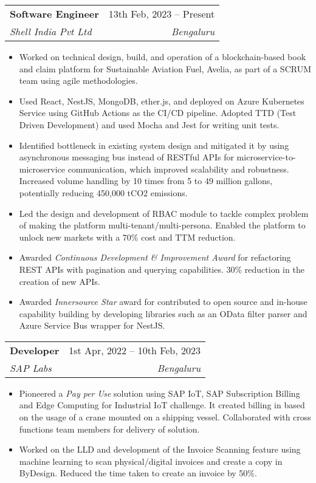 \documentclass[letterpaper,11pt]{article}
\makeatletter
\newcommand{\resumeItem}[1]{
  \item\small{
    {#1 \vspace{-2pt}}
  }
}
\newcommand{\resumeSubheading}[4]{
  \vspace{-2pt}\item
    \begin{tabular*}{0.97\textwidth}[t]{l@{\extracolsep{\fill}}r}
      \textbf{#1} & #2 \\
      \textit{\small#3} & \textit{\small #4} \\
    \end{tabular*}\vspace{-7pt}
}
\newcommand{\resumeSubSubheading}[2]{
    \item
    \begin{tabular*}{0.97\textwidth}{l@{\extracolsep{\fill}}r}
      \textit{\small#1} & \textit{\small #2} \\
    \end{tabular*}\vspace{-7pt}
}
\newcommand{\resumeSubHeadingListEnd}{\end{itemize}}
\newcommand{\resumeItemListStart}{\begin{itemize}}
\newcommand{\resumeItemListEnd}{\end{itemize}\vspace{-5pt}}
\makeatother
\begin{document}
    \resumeSubheading
      {Software Engineer}{13th Feb, 2023 -- Present}
      {Shell India Pvt Ltd}{Bengaluru}
      \resumeItemListStart
        \resumeItem{Worked on technical design, build, and operation of a blockchain-based book and claim platform for Sustainable Aviation Fuel, Avelia, as part of a SCRUM team using agile methodologies.}
        \resumeItem{Used React, NestJS, MongoDB, ether.js, and deployed on Azure Kubernetes Service using GitHub Actions as the CI/CD pipeline. Adopted TTD (Test Driven Development) and used Mocha and Jest for writing unit tests.}
        \resumeItem{Identified bottleneck in existing system design and mitigated it by using asynchronous messaging bus instead of RESTful APIs for microservice-to-microservice communication, which improved scalability and robustness. Increased volume handling by 10 times from 5 to 49 million gallons, potentially reducing 450,000 tCO2 emissions.}
        \resumeItem{Led the design and development of RBAC module to tackle complex problem of making the platform multi-tenant/multi-persona. Enabled the platform to unlock new markets with a 70\% cost and TTM reduction.}
        \resumeItem{Awarded \emph{Continuous Development \& Improvement Award} for refactoring REST APIs with pagination and querying capabilities. 30\% reduction in the creation of new APIs. }
        \resumeItem{Awarded \emph{Innersource Star} award for contributed to open source and in-house capability building by developing libraries such as an OData filter parser and Azure Service Bus wrapper for NestJS.}
      \resumeItemListEnd
      

    \resumeSubheading
      {Developer}{1st Apr, 2022 -- 10th Feb, 2023}
      {SAP Labs}{Bengaluru}
      \resumeItemListStart
        \resumeItem{Pioneered a \emph{Pay per Use} solution using SAP IoT, SAP Subscription Billing and Edge Computing for Industrial IoT challenge. It created billing in based on the usage of a crane mounted on a shipping vessel. Collaborated with cross functions team members for delivery of solution.}
        \resumeItem{Worked on the LLD and development of the Invoice Scanning feature using machine learning to scan physical/digital invoices and create a copy in ByDesign. Reduced the time taken to create an invoice by 50\%.}
    \resumeItemListEnd
\end{document}
